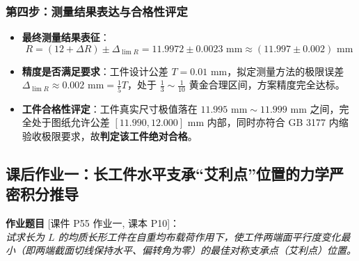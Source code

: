 \documentclass[11pt,a4paper]{ctexart}
\begin{document}
\subsubsection{第四步：测量结果表达与合格性评定}
\begin{itemize}[leftmargin=1.5em, itemsep=3pt]
    \item \textbf{最终测量结果表征}：
    \[ R = (12 + \Delta R) \pm \Delta_{\lim R} = 11.9972 \pm 0.0023\text{ mm} \approx (11.997 \pm 0.002)\text{ mm} \]
    \item \textbf{精度是否满足要求}：工件设计公差 $T = 0.01\text{ mm}$，拟定测量方法的极限误差 $\Delta_{\lim R} \approx 0.002\text{ mm} = \frac{1}{5}T$，处于 $\frac{1}{3} \sim \frac{1}{10}$ 黄金合理区间，方案精度完全达标。
    \item \textbf{工件合格性评定}：工件真实尺寸极值落在 $11.995\text{ mm} \sim 11.999\text{ mm}$ 之间，完全处于图纸允许公差 $[11.990, 12.000]\text{ mm}$ 内部，同时亦符合 GB 3177 内缩验收极限要求，故\textbf{判定该工件绝对合格}。
\end{itemize}

\subsection{课后作业一：长工件水平支承“艾利点”位置的力学严密积分推导}
\noindent\textbf{作业题目} \hfill\textsf{[课件 P55 作业一, 课本 P10]}：\\
\emph{试求长为 $L$ 的均质长形工件在自重均布载荷作用下，使工件两端面平行度变化最小（即两端截面切线保持水平、偏转角为零）的最佳对称支承点（艾利点）位置。}
\end{document}
